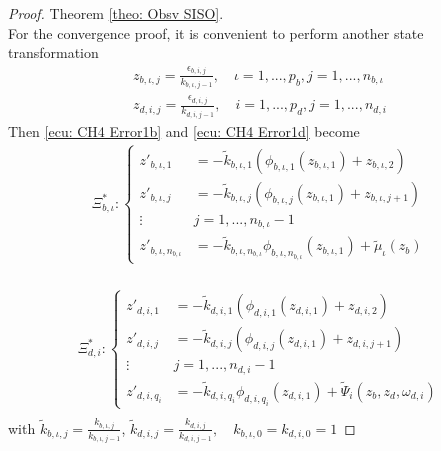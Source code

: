 \documentclass[11pt,letterpaper,twoside,openright]{report}
\begin{document}
\begin{proof}{Theorem \ref{theo: Obsv SISO}. \\}
	For the convergence proof, it is convenient to perform another state transformation
\begin{equation}
	\begin{split}
		z_{b,\iota,j} = \frac{\epsilon_{b,i,j}}{k_{b,\iota,j-1}},\quad \iota=1,...,p_b, j=1,...,n_{b,\iota} \\
		z_{d,i,j} = \frac{\epsilon_{d,i,j}}{k_{d,i,j-1}},\quad i=1,...,p_d, j=1,...,n_{d,i}
	\end{split}
\end{equation}
	Then \eqref{ecu: CH4 Error1b} and \eqref{ecu: CH4 Error1d} become
\begin{equation}
	\begin{split}\label{ecu: CH4 Error2b}
		\Xi^*_{b,\iota}: \left\{
		\begin{array}{rl}
			z'_{b,\iota,1} &= -\tilde{k}_{b,\iota,1}\left( \phi_{b,\iota,1}( z_{b,\iota,1} ) + z_{b,\iota,2} \right) \\
			z'_{b,\iota,j} &= -\tilde{k}_{b,\iota,j}\left( \phi_{b,\iota,j}( z_{b,\iota,1} ) + z_{b,\iota,j+1} \right)  \\
			\vdots \quad & j=1,...,n_{b,\iota}-1\\
			z'_{b,\iota,n_{b,\iota}} &= -\tilde{k}_{b,\iota,n_{b,\iota}} \phi_{b,\iota,n_{b,\iota}}( z_{b,\iota,1} ) + \tilde{\mu}_{\iota}(z_b)
		\end{array}
		\right. \\
	\end{split}
\end{equation}

\begin{equation}
	\begin{split}\label{ecu: CH4 Error2d}
		\Xi^*_{d,i}: \left\{
		\begin{array}{rl}
			z'_{d,i,1} &= -\tilde{k}_{d,i,1}\left( \phi_{d,i,1}( z_{d,i,1} ) + z_{d,i,2} \right)  \\
			z'_{d,i,j} &= -\tilde{k}_{d,i,j}\left( \phi_{d,i,j}( z_{d,i,1} ) + z_{d,i,j+1} \right)  \\
			\vdots \quad & j=1,...,n_{d,i}-1\\
			z'_{d,i,q_i} &= -\tilde{k}_{d,i,q_i} \phi_{d,i,q_i}( z_{d,i,1} ) + \tilde{\Psi}_{i}(z_b,z_d,\omega_{d,i})
		\end{array}
		\right. \\
	\end{split}
\end{equation}
with $\tilde{k}_{b,\iota,j}=\frac{k_{b,\iota,j}}{k_{b,\iota,j-1}}$, $\tilde{k}_{d,i,j}=\frac{k_{d,i,j}}{k_{d,i,j-1}}, \quad k_{b,\iota,0} = k_{d,i,0} = 1$


\end{proof}
\end{document}
